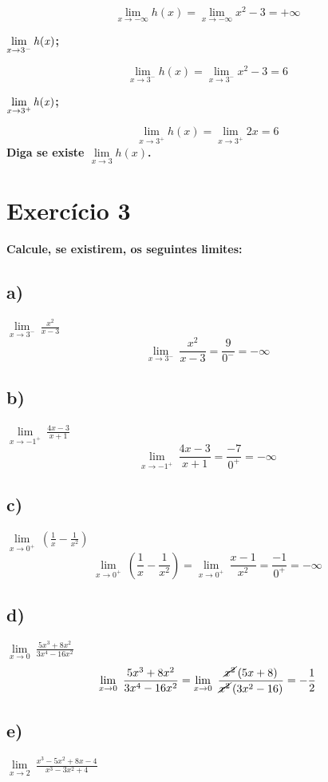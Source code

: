 \documentclass[a4paper]{article}
\begin{document}
\[\lim\limits_{x \to -\infty} h(x)=\lim\limits_{x \to -\infty} x^2-3= +\infty\]	

\textbf{$\lim\limits_{x \to 3^{-}} \it{h(x)}$;}

\[\lim\limits_{x \to 3^{-}} h(x)=\lim\limits_{x \to 3^{-}} x^2-3 = 6\]

\textbf{$\lim\limits_{x \to 3^{+}} \it{h(x)}$;}

\[\lim\limits_{x \to 3^{+}} h(x)=\lim\limits_{x \to 3^{+}} 2x = 6\]
\textbf{Diga se existe $\lim\limits_{x \to 3} h(x)$.}


\section*{Exercício 3}\textbf{Calcule, se existirem, os seguintes limites:}
	
\subsection*{a)}\textbf{$\lim\limits_{x \to 3^{-}}\ \frac{x^2}{x-3}$}
	\[\lim\limits_{x \to 3^{-}}\ \frac{x^2}{x-3}=\frac{9}{0^{-}}=-\infty\] 
	
\subsection*{b)}\textbf{$\lim\limits_{x \to -1^{+}}\ \frac{4x-3}{x+1}$}
\[\lim\limits_{x \to -1^{+}}\ \frac{4x-3}{x+1}=\frac{-7}{0^{+}}=-\infty\] 

\subsection*{c)}\textbf{$\lim\limits_{x \to 0^{+}}\ \left(\frac{1}{x}-\frac{1}{x^2}\right)$}
\[\lim\limits_{x \to 0^{+}}\ \left(\frac{1}{x}-\frac{1}{x^2}\right)=\lim\limits_{x \to 0^{+}}\ \frac{x-1}{x^2}=\frac{-1}{0^{+}}=-\infty\] 

\subsection*{d)}\textbf{$\lim\limits_{x \to 0}\ \frac{5x^3+8x^2}{3x^4-16x^2}$}
\[\lim\limits_{x \to 0}\ \frac{5x^3+8x^2}{3x^4-16x^2}=\lim\limits_{x \to 0}\ \frac{\cancel{x^2}\left(5x+8\right)}{\cancel{x^2}\left(3x^2-16\right)}=-\frac{1}{2}\]

\subsection*{e)}\textbf{$\lim\limits_{x \to 2}\ \frac{x^3-5x^2+8x-4}{x^3-3x^2+4}$}
\end{document}
